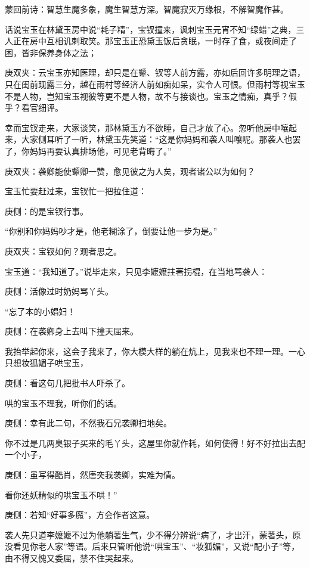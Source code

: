 
\begin{parag}
    \begin{note}蒙回前诗：智慧生魔多象，魔生智慧方深。智魔寂灭万缘根，不解智魔作甚。\end{note}
\end{parag}


\begin{parag}
    话说宝玉在林黛玉房中说“耗子精”，宝钗撞来，讽刺宝玉元宵不知“绿蜡”之典，三人正在房中互相讥刺取笑。那宝玉正恐黛玉饭后贪眠，一时存了食，或夜间走了困，皆非保养身体之法；\begin{note}庚双夹：云宝玉亦知医理，却只是在颦、钗等人前方露，亦如后回许多明理之语，只在闺前现露三分，越在雨村等经济人前如痴如呆，实令人可恨。但雨村等视宝玉不是人物，岂知宝玉视彼等更不是人物，故不与接谈也。宝玉之情痴，真乎？假乎？看官细评。\end{note}幸而宝钗走来，大家谈笑，那林黛玉方不欲睡，自己才放了心。忽听他房中嚷起来，大家侧耳听了一听，林黛玉先笑道：“这是你妈妈和袭人叫嚷呢。那袭人也罢了，你妈妈再要认真排场他，可见老背晦了。”\begin{note}庚双夹：袭卿能使颦卿一赞，愈见彼之为人矣，观者诸公以为如何？\end{note}
\end{parag}


\begin{parag}
    宝玉忙要赶过来，宝钗忙一把拉住道：\begin{note}庚侧：的是宝钗行事。\end{note}“你别和你妈妈吵才是，他老糊涂了，倒要让他一步为是。”\begin{note}庚双夹：宝钗如何？观者思之。\end{note}宝玉道：“我知道了。”说毕走来，只见李嬷嬷拄著拐棍，在当地骂袭人：\begin{note}庚侧：活像过时奶妈骂丫头。\end{note}“忘了本的小娼妇！\begin{note}庚侧：在袭卿身上去叫下撞天屈来。\end{note}我抬举起你来，这会子我来了，你大模大样的躺在炕上，见我来也不理一理。一心只想妆狐媚子哄宝玉，\begin{note}庚侧：看这句几把批书人吓杀了。\end{note}哄的宝玉不理我，听你们的话。\begin{note}庚侧：幸有此二句，不然我石兄袭卿扫地矣。\end{note}你不过是几两臭银子买来的毛丫头，这屋里你就作耗，如何使得！好不好拉出去配一个小子，\begin{note}庚侧：虽写得酷肖，然唐突我袭卿，实难为情。\end{note}看你还妖精似的哄宝玉不哄！”\begin{note}庚侧：若知“好事多魔”，方会作者这意。\end{note}袭人先只道李嬷嬷不过为他躺著生气，少不得分辨说“病了，才出汗，蒙著头，原没看见你老人家”等语。后来只管听他说“哄宝玉”、“妆狐媚”，又说“配小子”等，由不得又愧又委屈，禁不住哭起来。
\end{parag}



